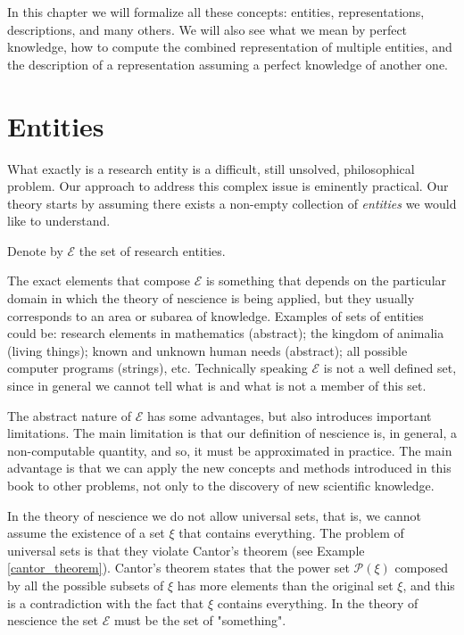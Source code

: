 In this chapter we will formalize all these concepts: entities, representations, descriptions, and many others. We will also see what we mean by perfect knowledge, how to compute the combined representation of multiple entities, and the description of a representation assuming a perfect knowledge of another one.

%
%

\section{Entities}
\label{sec:descriptions_entities}

What exactly is a research entity is a difficult, still unsolved, philosophical problem. Our approach to address this complex issue is eminently practical. Our theory starts by assuming there exists a non-empty collection of \emph{entities} we would like to understand.

\begin{notation}
Denote by $\mathcal{E}$ the set of research entities.
\end{notation}

The exact elements that compose $\mathcal{E}$ is something that depends on the particular domain in which the theory of nescience is being applied, but they usually corresponds to an area or subarea of knowledge. Examples of sets of entities could be: research elements in mathematics (abstract); the kingdom of animalia (living things); known and unknown human needs (abstract); all possible computer programs (strings), etc. Technically speaking $\mathcal{E}$ is not a well defined set, since in general we cannot tell what is and what is not a member of this set.

The abstract nature of $\mathcal{E}$ has some advantages, but also introduces important limitations. The main limitation is that our definition of nescience is, in general, a non-computable quantity, and so, it must be approximated in practice. The main advantage is that we can apply the new concepts and methods introduced in this book to other problems, not only to the discovery of new scientific knowledge.

In the theory of nescience we do not allow universal sets, that is, we cannot assume the existence of a set $\xi$ that contains everything. The problem of universal sets is that they violate Cantor's theorem (see Example \ref{cantor_theorem}). Cantor's theorem states that the power set $\mathcal{P}(\xi)$ composed by all the possible subsets of $\xi$ has more elements than the original set $\xi$, and this is a contradiction with the fact that $\xi$ contains everything. In the theory of nescience the set $\mathcal{E}$ must be the set of "something".

